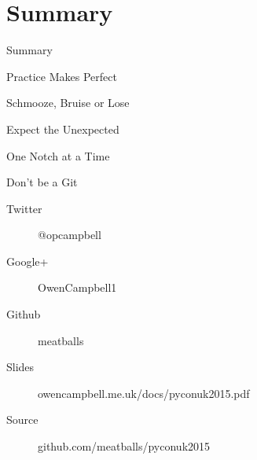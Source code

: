 \documentclass[14pt]{beamer}
\begin{document}

  \section*{Summary}
    \blankscreen{}

    \begin{frame}{Summary}
      \begin{description}
        \item Practice Makes Perfect
        \pause
        \item [Authority] Schmooze, Bruise or Lose
        \pause
        \item [Priorities] Expect the Unexpected
        \pause
        \item [Style] One Notch at a Time
        \pause
        \item [Process] Don't be a Git
      \end{description}
    \end{frame}

    \begin{frame}{}
      \begin{description}
        \item [Twitter] @opcampbell
        \item [Google+] OwenCampbell1
        \item [Github] meatballs
      \end{description}
      \vfill
      \begin{description}
        \item [Slides] {\small owencampbell.me.uk/docs/pyconuk2015.pdf}
        \item [Source] {\small github.com/meatballs/pyconuk2015}
      \end{description}
    \end{frame}
\end{document}
